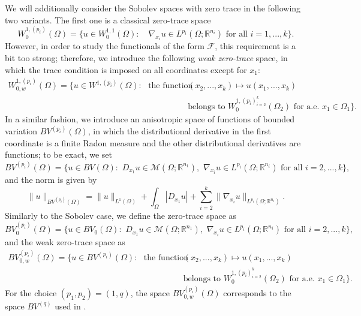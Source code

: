 \documentclass[reqno,12pt]{amsart}
\def\R{\mathbb R}
\numberwithin{equation}{section}
\begin{document}
We will additionally consider the Sobolev spaces with zero trace in the following two variants. The first one is a classical zero-trace space
\begin{equation}
W_0^{1,(p_i)}(\Omega) = \bigg\{ u \in W^{1,1}_0(\Omega): \quad \nabla_{x_i} u \in L^{p_i}(\Omega; \R^{n_i}) \mbox{ for all } i = 1,...,k \bigg\}.
\end{equation}
However, in order to study the functionals of the form $\mathcal{F}$, this requirement is a bit too strong; therefore, we introduce the following {\it weak zero-trace} space, in which the trace condition is imposed on all coordinates except for $x_1$:
\begin{align}
W_{0,w}^{1,(p_i)}(\Omega) = \bigg\{ u \in W^{1,(p_i)}(\Omega): \,\, \mbox{ the function } &(x_2,...,x_k) \mapsto u(x_1,...,x_k) \\
&\mbox{belongs to } W_0^{1,(p_i)_{i=2}^k}(\Omega_2) \mbox{ for a.e. } x_1 \in \Omega_1 \bigg\}.
\end{align}
In a similar fashion, we introduce an anisotropic space of functions of bounded variation $BV^{(p_i)}(\Omega)$, in which the distributional derivative in the first coordinate is a finite Radon measure and the other distributional derivatives are functions; to be exact, we set
\begin{equation}
BV^{(p_i)}(\Omega) = \bigg\{ u \in BV(\Omega): \,\, D_{x_1} u \in \mathcal{M}(\Omega; \R^{n_1}), \,\, \nabla_{x_i} u \in L^{p_i}(\Omega; \R^{n_i}) \mbox{ for all } i = 2,...,k \bigg\},
\end{equation}
and the norm is given by
\begin{equation}
\| u \|_{BV^{(p_i)}(\Omega)} = \| u \|_{L^1(\Omega)} + \int_\Omega |D_{x_1} u| + \sum_{i=2}^k \| \nabla_{x_i} u \|_{L^{p_i}(\Omega; \R^{n_i})}.
\end{equation}
Similarly to the Sobolev case, we define the zero-trace space as
\begin{equation}
BV_0^{(p_i)}(\Omega) = \bigg\{ u \in BV_0(\Omega): \,\, D_{x_1} u \in \mathcal{M}(\Omega; \R^{n_1}), \,\, \nabla_{x_i} u \in L^{p_i}(\Omega; \R^{n_i}) \mbox{ for all } i = 2,...,k \bigg\},
\end{equation}
and the weak zero-trace space as
\begin{align}
BV_{0,w}^{(p_i)}(\Omega) = \bigg\{ u \in BV^{(p_i)}(\Omega): \,\, \mbox{ the function } &(x_2,...,x_k) \mapsto u(x_1,...,x_k) \\
&\mbox{belongs to } W_0^{1,(p_i)_{i=2}^k}(\Omega_2) \mbox{ for a.e. } x_1 \in \Omega_1 \bigg\}.
\end{align}
For the choice $(p_1,p_2) = (1,q)$, the space $BV_{0,w}^{(p_i)}(\Omega)$ corresponds to the space $BV^{(q)}$ used in \cite{MRST}. 
\end{document}
